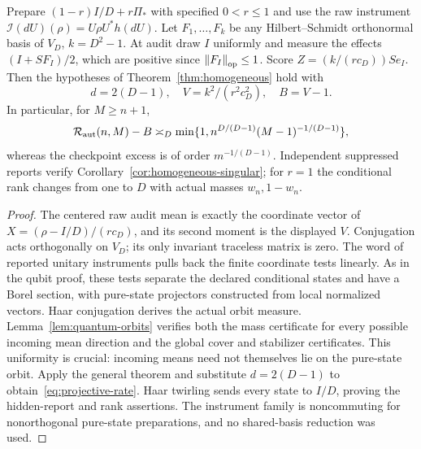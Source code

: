 \begin{theorem}\label{thm:projective}
Prepare $(1-r)I/D+r\Pi_*$ with specified $0<r\le1$ and use the raw instrument $\mathcal I(dU)(\rho)=U\rho U^*h(dU)$. Let $F_1,\ldots,F_k$ be any Hilbert--Schmidt orthonormal basis of $V_D$, $k=D^2-1$. At audit draw $I$ uniformly and measure the effects $(I+S F_I)/2$, which are positive since $\left\lVert F_I\right\rVert_{\rm op}\le1$. Score $Z=(k/(r c_D))S e_I$. Then the hypotheses of Theorem~\ref{thm:homogeneous} hold with
\[
 d=2(D-1),\quad V=k^2/(r^2c_D^2),\quad B=V-1.
\]
In particular, for $M\ge n+1$,
\begin{equation}\label{eq:projective-rate}
 \mathcal R_{\rm aut}(n,M)-B\asymp_D
 \min\{1,n^{D/(D-1)}(M-1)^{-1/(D-1)}\},
\end{equation}
whereas the checkpoint excess is of order $m^{-1/(D-1)}$. Independent suppressed reports verify Corollary~\ref{cor:homogeneous-singular}; for $r=1$ the conditional rank changes from one to $D$ with actual masses $w_n,1-w_n$.
\end{theorem}
\begin{proof}
The centered raw audit mean is exactly the coordinate vector of $X=(\rho-I/D)/(r c_D)$, and its second moment is the displayed $V$. Conjugation acts orthogonally on $V_D$; its only invariant traceless matrix is zero. The word of reported unitary instruments pulls back the finite coordinate tests linearly. As in the qubit proof, these tests separate the declared conditional states and have a Borel section, with pure-state projectors constructed from local normalized vectors. Haar conjugation derives the actual orbit measure. Lemma~\ref{lem:quantum-orbits} verifies both the mass certificate for every possible incoming mean direction and the global cover and stabilizer certificates. This uniformity is crucial: incoming means need not themselves lie on the pure-state orbit. Apply the general theorem and substitute $d=2(D-1)$ to obtain~\eqref{eq:projective-rate}. Haar twirling sends every state to $I/D$, proving the hidden-report and rank assertions. The instrument family is noncommuting for nonorthogonal pure-state preparations, and no shared-basis reduction was used.
\end{proof}
